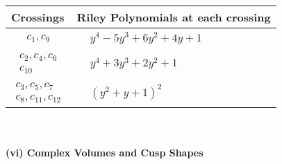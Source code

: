 \documentclass[1p]{elsarticle_modified}
\theoremstyle{definition}
\begin{document}
\begin{tabular}{m{50pt}|m{274pt}}
Crossings & \hspace{64pt}Riley Polynomials at each crossing \\
\hline $$\begin{aligned}c_{1},c_{9}\end{aligned}$$&$\begin{aligned}
&y^4-5 y^3+6 y^2+4 y+1
\end{aligned}$\\
\hline $$\begin{aligned}c_{2},c_{4},c_{6}\\c_{10}\end{aligned}$$&$\begin{aligned}
&y^4+3 y^3+2 y^2+1
\end{aligned}$\\
\hline $$\begin{aligned}c_{3},c_{5},c_{7}\\c_{8},c_{11},c_{12}\end{aligned}$$&$\begin{aligned}
&(y^2+y+1)^2
\end{aligned}$\\
\hline
\end{tabular}\\~\\
\newpage\flushleft \textbf{(vi) Complex Volumes and Cusp Shapes}
\end{document}
